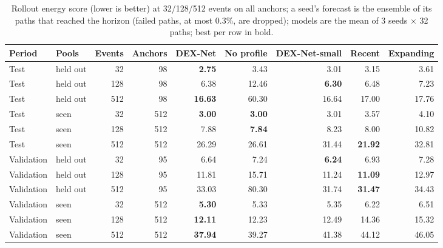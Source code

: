 \documentclass[11pt]{article}
\begin{document}
\begin{table}[t]
\centering
\caption{Rollout energy score (lower is better) at 32/128/512 events on all anchors; a seed's forecast is the ensemble of its paths that reached the horizon (failed paths, at most 0.3\%, are dropped); models are the mean of 3 seeds \ensuremath{\times} 32 paths; best per row in bold.}\label{tab:4}
\begin{adjustbox}{max width=\linewidth}
\begin{tabular}{llrrrrrrr}
\toprule
Period & Pools & Events & Anchors & DEX-Net & No profile & DEX-Net-small & Recent & Expanding \\
\midrule
Test & held out & 32 & 98 & \textbf{2.75} & 3.43 & 3.01 & 3.15 & 3.61 \\
Test & held out & 128 & 98 & 6.38 & 12.46 & \textbf{6.30} & 6.48 & 7.23 \\
Test & held out & 512 & 98 & \textbf{16.63} & 60.30 & 16.64 & 17.00 & 17.76 \\
\midrule
Test & seen & 32 & 512 & \textbf{3.00} & \textbf{3.00} & 3.01 & 3.57 & 4.10 \\
Test & seen & 128 & 512 & 7.88 & \textbf{7.84} & 8.23 & 8.00 & 10.82 \\
Test & seen & 512 & 512 & 26.29 & 26.61 & 31.44 & \textbf{21.92} & 32.81 \\
\midrule
Validation & held out & 32 & 95 & 6.64 & 7.24 & \textbf{6.24} & 6.93 & 7.28 \\
Validation & held out & 128 & 95 & 11.81 & 15.71 & 11.24 & \textbf{11.09} & 12.97 \\
Validation & held out & 512 & 95 & 33.03 & 80.30 & 31.74 & \textbf{31.47} & 34.43 \\
\midrule
Validation & seen & 32 & 512 & \textbf{5.30} & 5.33 & 5.35 & 6.22 & 6.51 \\
Validation & seen & 128 & 512 & \textbf{12.11} & 12.23 & 12.49 & 14.36 & 15.32 \\
Validation & seen & 512 & 512 & \textbf{37.94} & 39.27 & 41.38 & 44.12 & 46.05 \\
\bottomrule
\end{tabular}
\end{adjustbox}
\end{table}
\end{document}
